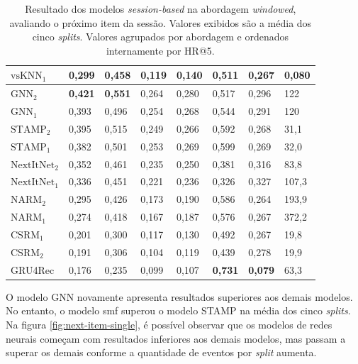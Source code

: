 \begin{table}[htbp]
\begin{tabular}{|l|l|l|l|l|l|l|l|}
    \hline
    $\text{vsKNN}_{1}$ & 0,299 & 0,458 & 0,119 & 0,140 & 0,511 & 0,267 & 0,080 \\
    \hline
    \hline
    $\text{GNN}_2$ & \textbf{0{,}421} & \textbf{0{,}551} & 0,264 & 0,280 & 0,517 & 0,296 & 122 \\
    \hline
    $\text{GNN}_1$ & 0,393 & 0,496 & 0,254 & 0,268 & 0,544 & 0,291 & 120 \\
    \hline
    $\text{STAMP}_2$ & 0,395 & 0,515 & 0,249 & 0,266 & 0,592 & 0,268 & 31,1 \\
    \hline
    $\text{STAMP}_1$ & 0,382 & 0,501 & 0,253 & 0,269 & 0,599 & 0,269 & 32,0 \\
    \hline
    $\text{NextItNet}_2$ & 0,352 & 0,461 & 0,235 & 0,250 & 0,381 & 0,316 & 83,8 \\  
    \hline
    $\text{NextItNet}_1$ & 0,336 & 0,451 & 0,221 & 0,236 & 0,326 & 0,327 & 107,3 \\
    \hline
    $\text{NARM}_2$ & 0,295 & 0,426 & 0,173 & 0,190 & 0,586 & 0,264 & 193,9 \\
    \hline
    $\text{NARM}_1$ & 0,274 & 0,418 & 0,167 & 0,187 & 0,576 & 0,267 & 372,2 \\
    \hline
    $\text{CSRM}_1$ & 0,201 & 0,300 & 0,117 & 0,130 & 0,492 & 0,267 & 19,8 \\
    \hline
    $\text{CSRM}_2$ & 0,191 & 0,306 & 0,104 & 0,119 & 0,439 & 0,278 & 19,9 \\
    \hline
    GRU4Rec & 0,176 & 0,235 & 0,099 & 0,107 & \textbf{0{,}731} & \textbf{0,079} & 63,3 \\
    \hline
    \end{tabular}
  \caption{Resultado dos modelos \textit{session-based} na abordagem
  \textit{windowed}, avaliando o próximo item da sessão. Valores exibidos são a
  média dos cinco \textit{splits}. Valores agrupados por abordagem e ordenados internamente por HR@5.}
\label{tab:windowed_next_item_all}
\end{table}


O modelo GNN novamente apresenta resultados superiores aos demais modelos. No
entanto, o modelo smf superou o modelo STAMP na média dos cinco \textit{splits}.
Na figura \ref{fig:next-item-single}, é possível observar que os modelos de
redes neurais começam com resultados inferiores aos demais modelos, mas passam a
superar os demais conforme a quantidade de eventos por \textit{split} aumenta.

